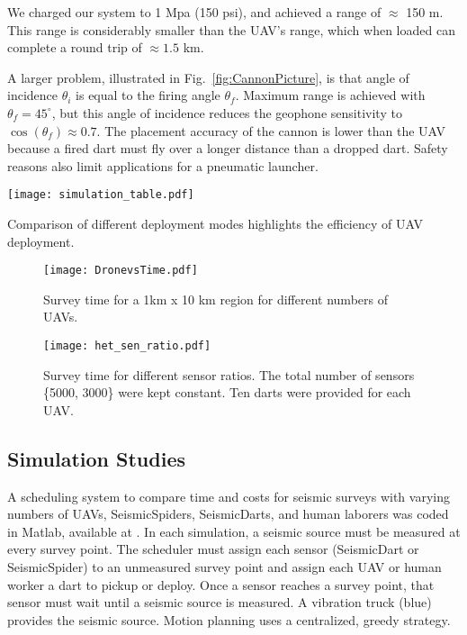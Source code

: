 We charged our system to 1 Mpa (150 psi), and achieved a range of $\approx$ 150 m.
This range is considerably smaller than the UAV's range, which when loaded can complete a round trip of $\approx 1.5$ km.

A larger problem, illustrated in Fig.~\ref{fig:CannonPicture}, is that angle of incidence $\theta_i$ is equal to the firing angle $\theta_f$. 
Maximum range is achieved with $\theta_f = 45^\circ$, but this angle of incidence reduces the geophone sensitivity to $\cos(\theta_f )\approx 0.7$.
The placement accuracy of the cannon is lower than the UAV because a fired dart must fly over a longer distance than a dropped dart. 
Safety reasons also limit applications for a pneumatic launcher.





\begin{table} \centering
  {\texttt{[image: simulation\_table.pdf]}}
 \caption{Comparison of different  deployment modes highlights the efficiency of UAV deployment.} 
 \label{tab:Sim_table}
\end{table}

\begin{figure} \centering
  {\texttt{[image: DronevsTime.pdf]}}
 \caption{Survey time for a 1km x 10 km region for different numbers of UAVs.} 
 \label{fig:DronevsTime}
 \vspace{-1em}
\end{figure}

\begin{figure} \centering
  {\texttt{[image: het\_sen\_ratio.pdf]}}
 \caption{Survey time for different sensor ratios. The total number of sensors \{5000, 3000\} were kept constant. Ten darts were provided for each UAV. } 
 \label{fig:het_sen_ratio}
  \vspace{-1em}
\end{figure}

\subsection{Simulation Studies}
   A scheduling system to compare  time and costs for seismic surveys with varying numbers of UAVs, SeismicSpiders, SeismicDarts, and human laborers was coded in  {\sc Matlab}, available at \cite{Srikanth2016seismicScheduler}.
   In each simulation, a seismic source must be measured at every survey point. 
   The scheduler must assign each sensor (SeismicDart or SeismicSpider) to an unmeasured survey point and assign each UAV or human worker a dart to pickup or deploy.  Once a sensor reaches a survey point, that sensor must wait until a seismic source is measured.
   A vibration truck (blue) provides the seismic source.
   Motion planning uses a centralized, greedy strategy.
   

